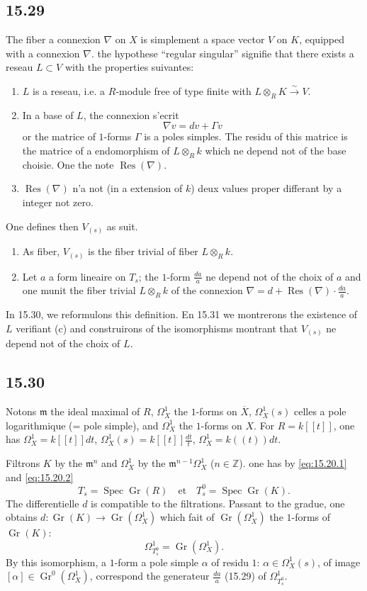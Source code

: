 \documentclass[12pt,a4paper]{article}
\theoremstyle{plain}
\theoremstyle{definition}
\theoremstyle{remark}
\DeclareMathOperator{\Spec}{Spec}
\DeclareMathOperator{\Gr}{Gr}
\DeclareMathOperator{\Res}{Res}
\newcommand{\bZ}{\mathbb{Z}}
\begin{document}
\subsection*{15.29}

The fiber a connexion $\nabla$ on $X$ is simplement a space vector $V$ on $K$, equipped with a connexion $\nabla$. the hypothese ``regular singular'' signifie that there exists a reseau $L \subset V$ with the properties suivantes:
\begin{enumerate}[label=(\alph*), nosep]
\item $L$ is a reseau, i.e. a $R$-module free of type finite with $L \otimes_R K \xrightarrow{\sim} V$.
\item In a base of $L$, the connexion s'ecrit
\[
\nabla v = dv + \Gamma v
\]
or the matrice of $1$-forms $\Gamma$ is a poles simples. The residu of this matrice is the matrice of a endomorphism of $L \otimes_R k$ which ne depend not of the base choisie. One the note $\Res(\nabla)$.
\item $\Res(\nabla)$ n'a not (in a extension of $k$) deux values proper differant by a integer not zero.
\end{enumerate}
One defines then $V_{(s)}$ as suit.
\begin{enumerate}[label=(\arabic*), nosep]
\item As fiber, $V_{(s)}$ is the fiber trivial of fiber $L \otimes_R k$.
\item Let $a$ a form lineaire on $T_s$; the $1$-form $\frac{da}{a}$ ne depend not of the choix of $a$ and one munit the fiber trivial $L \otimes_R k$ of the connexion $\nabla = d + \Res(\nabla) \cdot \frac{da}{a}$.
\end{enumerate}

In 15.30, we reformulons this definition. En 15.31 we montrerons the existence of $L$ verifiant (c) and construirons of the isomorphisms montrant that $V_{(s)}$ ne depend not of the choix of $L$.

\subsection*{15.30}

Notons $\mathfrak{m}$ the ideal maximal of $R$, $\Omega_X^1$ the $1$-forms on $\overline{X}$, $\Omega_X^1(s)$ celles a pole logarithmique (= pole simple), and $\Omega_X^1$ the $1$-forms on $X$. For $R = k[[t]]$, one has $\Omega_X^1 = k[[t]]dt$, $\Omega_X^1(s) = k[[t]]\frac{dt}{t}$, $\Omega_X^1 = k((t))dt$.

Filtrons $K$ by the $\mathfrak{m}^n$ and $\Omega_X^1$ by the $\mathfrak{m}^{n-1}\Omega_X^1$ ($n \in \bZ$). one has by \eqref{eq:15.20.1} and \eqref{eq:15.20.2}
\[
T_s = \Spec \Gr(R) \quad \text{et} \quad T_s^0 = \Spec \Gr(K).
\]
The differentielle $d$ is compatible to the filtrations. Passant to the gradue, one obtains $d: \Gr(K) \to \Gr(\Omega_X^1)$ which fait of $\Gr(\Omega_X^1)$ the $1$-forms of $\Gr(K)$:
\[
\Omega_{T_s^0}^1 = \Gr(\Omega_X^1).
\]
By this isomorphism, a $1$-form a pole simple $\alpha$ of residu $1$: $\alpha \in \Omega_X^1(s)$, of image $[\alpha] \in \Gr^0(\Omega_X^1)$, correspond the generateur $\frac{da}{a}$ (15.29) of $\Omega_{T_s^0}^1$.
\end{document}
